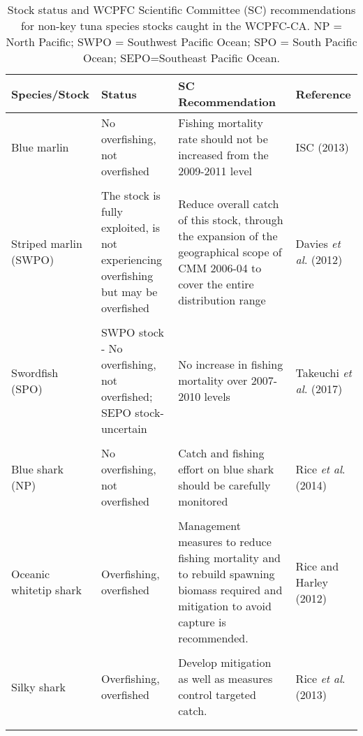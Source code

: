 \begingroup\fontsize{9pt}{11pt}\selectfont
\begin{longtable}{p{2.5cm}p{4cm}p{5.5cm}p{2cm}}
\caption{Stock status and WCPFC Scientific Committee (SC) recommendations for non-key tuna species stocks caught in the WCPFC-CA. NP = North Pacific; SWPO = Southwest Pacific Ocean; SPO = South Pacific Ocean; SEPO=Southeast Pacific Ocean.} \\ 
  \hline
\hline
Species/Stock & Status & SC Recommendation & Reference \\ 
  \hline
Blue marlin & No overfishing, not overfished & Fishing mortality rate should not be increased from the 2009-2011 level & ISC (2013) \\ \\
   Striped marlin (SWPO) & The stock is fully exploited, is not experiencing overfishing but may be overfished & Reduce overall catch of this stock, through the expansion of the geographical scope of CMM 2006-04 to cover the entire distribution range & Davies {\itshape et al}. (2012) \\ \\
  Swordfish (SPO) & SWPO stock - No overfishing, not overfished; SEPO stock- uncertain & No increase in fishing mortality over 2007-2010 levels & Takeuchi {\itshape et al}. (2017) \\ \\
   Blue shark (NP) & No overfishing, not overfished & Catch and fishing effort on blue shark should be carefully monitored & Rice {\itshape et al}. (2014) \\ \\
  Oceanic whitetip shark & Overfishing, overfished & Management measures to reduce fishing mortality and to rebuild spawning biomass required and mitigation to avoid capture is recommended. & Rice and Harley (2012) \\ \\
   Silky shark & Overfishing, overfished & Develop mitigation as well as measures control targeted catch. & Rice {\itshape et al}. (2013) \\ \\
   \hline
\hline
\label{tab3}
\end{longtable}
\endgroup
